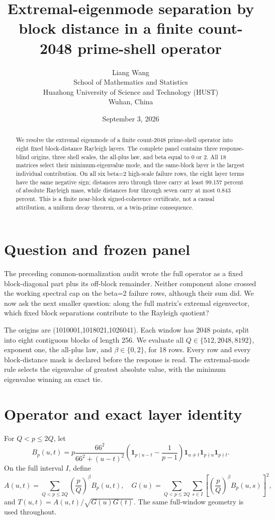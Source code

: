 \documentclass[10pt]{article}
\title{Extremal-eigenmode separation by block distance in a finite\newline
count-2048 prime-shell operator}
\author{Liang Wang\\
School of Mathematics and Statistics\\
Huazhong University of Science and Technology (HUST)\\
Wuhan, China}
\date{September 3, 2026}
\begin{document}
\maketitle

\begin{abstract}
We resolve the extremal eigenmode of a finite count-2048 prime-shell operator
into eight fixed block-distance Rayleigh layers.  The complete panel contains
three response-blind origins, three shell scales, the all-plus law, and beta
equal to 0 or 2.  All 18 matrices select their minimum-eigenvalue mode, and
the same-block layer is the largest individual contribution.  On all six
beta=2 high-scale failure rows, the eight layer terms have the same negative
sign; distances zero through three carry at least 99.157 percent of absolute
Rayleigh mass, while distances four through seven carry at most 0.843
percent.  This is a finite near-block signed-coherence certificate, not a
causal attribution, a uniform decay theorem, or a twin-prime consequence.
\end{abstract}

\section{Question and frozen panel}

The preceding common-normalization audit wrote the full operator as a fixed
block-diagonal part plus its off-block remainder.  Neither component alone
crossed the working spectral cap on the beta=2 failure rows, although their
sum did.  We now ask the next smaller question: along the full matrix's
extremal eigenvector, which fixed block separations contribute to the
Rayleigh quotient?

The origins are (1010001,1018021,1026041).  Each window has 2048 points,
split into eight contiguous blocks of length 256.  We evaluate all
\(Q\in\{512,2048,8192\}\), exponent one, the all-plus law, and
\(\beta\in\{0,2\}\), for 18 rows.  Every row and every block-distance mask
is declared before the response is read.  The extremal-mode rule selects the
eigenvalue of greatest absolute value, with the minimum eigenvalue winning an
exact tie.

\section{Operator and exact layer identity}

For \(Q<p\leq2Q\), let
\[
 B_p(u,t)=p\frac{66^2}{66^2+(u-t)^2}
 \left(\mathbf 1_{p\mid u-t}-\frac{1}{p-1}\right)
 \mathbf 1_{u\ne t}\mathbf 1_{p\nmid u}\mathbf 1_{p\nmid t}.
\]
On the full interval \(I\), define
\[
 A(u,t)=\sum_{Q<p\leq2Q}\left(\frac pQ\right)^\beta B_p(u,t),
 \quad
 G(u)=\sum_{Q<p\leq2Q}\sum_{s\in I}
 \left[\left(\frac pQ\right)^\beta B_p(u,s)\right]^2,
\]
and \(T(u,t)=A(u,t)/\sqrt{G(u)G(t)}\).  The same full-window geometry is used
throughout.
\end{document}
